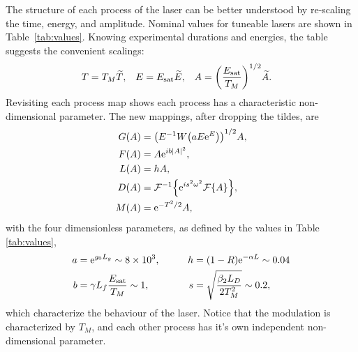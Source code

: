%
%
%

The structure of each process of the laser can be better understood by re-scaling the time, energy, and amplitude. Nominal values for tuneable lasers are shown in Table~\ref{tab:values}. Knowing experimental durations and energies, the table suggests the convenient scalings:
\begin{align}
	T &= T_M \widetilde{T},& E &= \Es \widetilde{E},& A &= \left( \frac{\Es}{T_M} \right)^{1/2} \widetilde{A}.
\end{align}
Revisiting each process map shows each process has a characteristic non-dimensional parameter. The new mappings, after dropping the tildes, are
\begin{subequations}
\label{eq:effects}
\begin{align}
\label{eq:gain}
G(A) &= \left(E^{-1} W \left( a E \textrm{e}^{E}\right) \right)^{1/2} A, \\
\label{eq:fibre}
F(A) &= A \textrm{e}^{i b |A|^2}, \\
\label{eq:loss}
L(A) &= h A, \\
\label{eq:disp}
D(A) &= \FTi{\textrm{e}^{i s^2 \omega^2} \FT{A}}, \\
\label{eq:mod}
M(A) &= \textrm{e}^{-T^2 / 2} A,
\end{align}
\end{subequations}
with the four dimensionless parameters, as defined by the values in Table \ref{tab:values},
\begin{equation}
\begin{aligned}
	a &= \textrm{e}^{g_0 L_g} \sim 8 \times 10^3,& \qquad h &= (1 - R) \textrm{e}^{-\alpha L} \sim 0.04\\
	b &= \gamma L_f \frac{E_{\textrm{sat}}}{T_M} \sim 1,& \qquad s &= \sqrt{\frac{\beta_2 L_D}{2 T_M^2}} \sim 0.2,
\label{eq:ndparam}
\end{aligned}
\end{equation}
which characterize the behaviour of the laser. Notice that the modulation is characterized by $T_M$, and each other process has it's own independent non-dimensional parameter.

